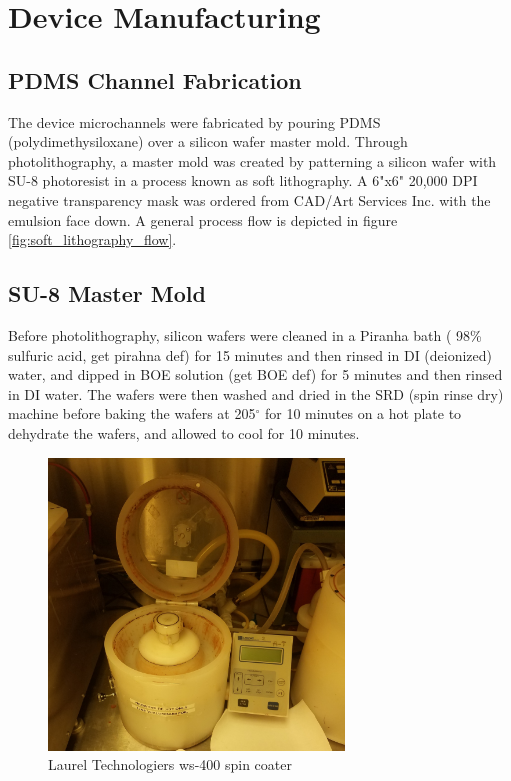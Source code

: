
\section{Device Manufacturing}

\subsection{PDMS Channel Fabrication}
\par The device microchannels were fabricated by pouring PDMS (polydimethysiloxane) over a silicon wafer master mold. Through photolithography, a master mold was created by patterning a silicon wafer with SU-8 photoresist in  a process known as soft lithography. A 6"x6" 20,000 DPI negative transparency mask was ordered from CAD/Art Services Inc. with the emulsion face down. A general process flow is depicted in figure \ref{fig:soft_lithography_flow}.


\subsection*{SU-8 Master Mold}

\par Before photolithography, silicon wafers were cleaned in a Piranha bath ( 98\% sulfuric acid, get pirahna def) for 15 minutes and then rinsed in DI (deionized) water, and dipped in BOE solution (get BOE def) for 5 minutes and then rinsed in DI water. The wafers were then washed and dried in the SRD (spin rinse dry) machine before baking the wafers at 205$^\circ$ for 10 minutes on a hot plate to dehydrate the wafers, and allowed to cool for 10 minutes. 

\begin{figure}[h]
    \centering
    \includegraphics[width=0.7\textwidth]{images/resist_spinner_open.jpg}
    \caption{Laurel Technologiers ws-400 spin coater}
    \label{fig:spin_coater}
\end{figure}

